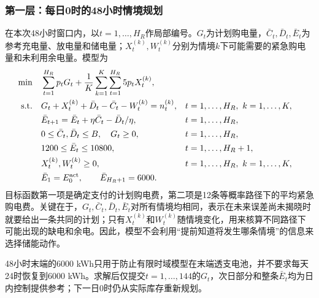 \documentclass[UTF8,fontset=none,12pt,a4paper]{ctexart}
\begin{document}
\subsubsection{第一层：每日0时的48小时情境规划}
在本次48小时窗口内，以$t=1,\ldots,H_R$作局部编号。$G_t$为计划购电量，$\bar C_t,\bar D_t,\bar E_t$为参考充电量、放电量和储电量；$X_t^{(k)},W_t^{(k)}$分别为情境$k$下可能需要的紧急购电量和未利用余电量。模型为
\begin{align}
 \min\quad
 &\sum_{t=1}^{H_R}p_tG_t
 +\frac1K\sum_{k=1}^{K}\sum_{t=1}^{H_R}5p_tX_t^{(k)},\label{eq:q2reference}\\
 \text{s.t.}\quad
 &G_t+X_t^{(k)}+\bar D_t-\bar C_t-W_t^{(k)}=n_t^{(k)},
 &&t=1,\ldots,H_R,\ k=1,\ldots,K,\nonumber\\
 &\bar E_{t+1}=\bar E_t+\eta\bar C_t-\bar D_t/\eta,
 &&t=1,\ldots,H_R,\nonumber\\
 &0\le \bar C_t,\bar D_t\le B,\quad G_t\ge0,
 &&t=1,\ldots,H_R,\nonumber\\
 &1200\le\bar E_t\le10800,
 &&t=1,\ldots,H_R+1,\nonumber\\
 &X_t^{(k)},W_t^{(k)}\ge0,
 &&t=1,\ldots,H_R,\ k=1,\ldots,K,\nonumber\\
 &\bar E_1=E_0^{\rm act},\qquad \bar E_{H_R+1}=6000.\nonumber
\end{align}
目标函数第一项是确定支付的计划购电费，第二项是12条等概率路径下的平均紧急购电费。关键在于，$G_t,\bar C_t,\bar D_t,\bar E_t$对所有情境均相同，表示在未来误差尚未揭晓时就要给出一条共同的计划；只有$X_t^{(k)}$和$W_t^{(k)}$随情境变化，用来核算不同路径下可能出现的缺电和余电。因此，模型不会利用“提前知道将发生哪条情境”的信息来选择储能动作。

48小时末端的6000 kWh只用于防止有限时域模型在末端透支电池，并不要求每天24时恢复到6000 kWh。求解后仅提交$t=1,\ldots,144$的$G_t$，次日部分和整条$\bar E_t$均为日内控制提供参考；下一日0时仍从实际库存重新规划。
\end{document}
